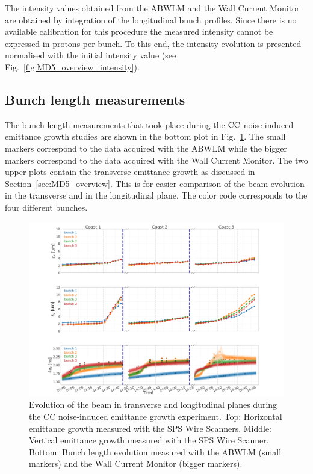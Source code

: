 The intensity values obtained from the ABWLM and the Wall Current Monitor are obtained by integration of the longitudinal bunch profiles. Since there is no available calibration for this procedure the measured intensity cannot be expressed in protons per bunch. To this end, the intensity evolution is presented normalised with the initial intensity value (see Fig.~\ref{fig:MD5_overview_intensity}). 

\subsection{Bunch length measurements}\label{subsec:bunch_length_meas_2018}
The bunch length measurements that took place during the ${\mathrm{CC}}$ noise induced emittance growth studies are shown in the bottom plot in Fig.~\ref{fig:MD5_overview_x_y_sigma_t}. The small markers correspond to the data acquired with the ABWLM while the bigger markers correspond to the data acquired with the Wall Current Monitor. The two upper plots contain the transverse emittance growth as discussed in Section~\ref{sec:MD5_overview}. This is for easier comparison of the beam evolution in the transverse and in the longitudinal plane. The color code corresponds to the four different bunches.

\begin{figure}
   \centering
   \includegraphics[width=1.0\textwidth]{images/Ch5/MD5_overview_x_no_legendMD5_overview_y_no_legendMD5_overview_4sigma_t_no_title_with_wall_current_monitor.png}
   \caption{Evolution of the beam in transverse and longitudinal planes during the CC noise-induced emittance growth experiment. Top: Horizontal emittance growth measured with the SPS Wire Scanners. Middle: Vertical emittance growth measured with the SPS Wire Scanner. Bottom: Bunch length evolution measured with the ABWLM (small markers) and the Wall Current Monitor (bigger markers).}
   \label{fig:MD5_overview_x_y_sigma_t}
\end{figure}

